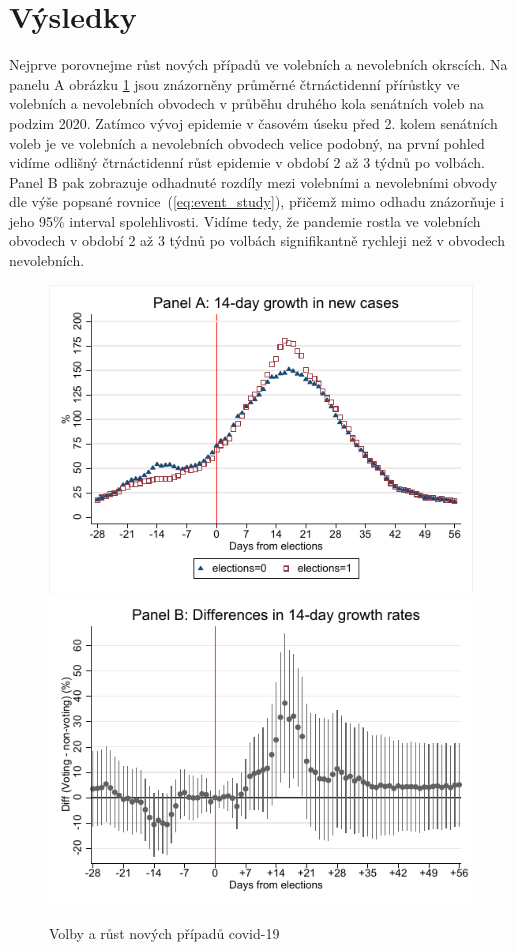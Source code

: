 \section*{Výsledky}
Nejprve porovnejme růst nových případů ve volebních a nevolebních okrscích. Na panelu A obrázku \ref{fig:Covid_growth14}  jsou znázorněny průměrné čtrnáctidenní přírůstky ve volebních a nevolebních obvodech v průběhu druhého kola senátních voleb na podzim 2020. Zatímco vývoj epidemie v časovém úseku před 2. kolem senátních voleb
je ve volebních a nevolebních obvodech velice podobný, na první pohled vidíme odlišný čtrnáctidenní růst epidemie v období 2 až 3 týdnů po volbách. Panel B pak zobrazuje odhadnuté rozdíly mezi volebními a nevolebními obvody dle výše popsané rovnice~(\ref{eq:event_study}),
přičemž mimo odhadu znázorňuje i jeho 95\% interval spolehlivosti. Vidíme tedy, že pandemie rostla ve volebních obvodech v období 2 až 3 týdnů po volbách signifikantně rychleji než v obvodech nevolebních. 

\begin{figure}     
     \begin{center}
    \includegraphics[scale=0.58]{binscatter_new_cases14.pdf} 
    \includegraphics[scale=0.58]{Covid+_growth_rate14.pdf} 
    \label{fig:Covid_growth14}
	\caption{Volby a růst nových případů covid-19}
	\end{center}
\end{figure}

